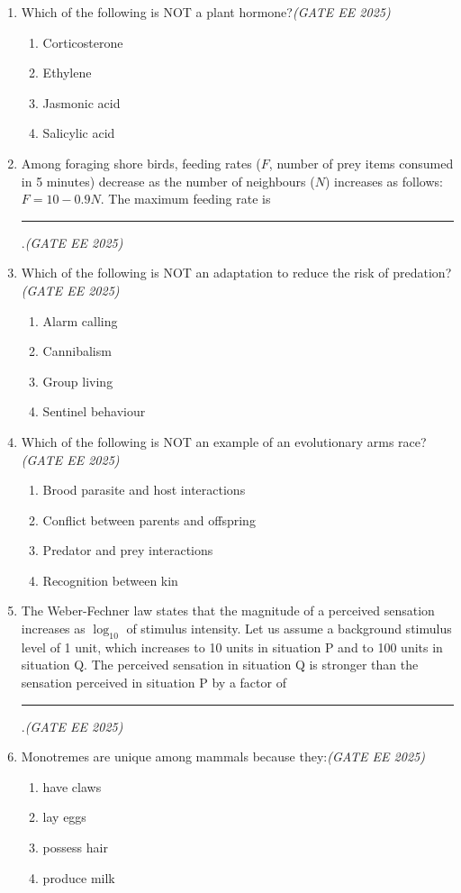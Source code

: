\documentclass[11pt,a4paper]{article}
\begin{document}
\begin{enumerate}[leftmargin=*,label=\textbf{Q.\arabic*},resume]
\item Which of the following is NOT a plant hormone?\hfill \textit{(GATE EE 2025)}
\begin{enumerate}[label=(\Alph*)]
\item Corticosterone
\item Ethylene
\item Jasmonic acid
\item Salicylic acid
\end{enumerate}

\item Among foraging shore birds, feeding rates ($F$, number of prey items consumed in 5 minutes) decrease as the number of neighbours ($N$) increases as follows: $F = 10 - 0.9 N$. The maximum feeding rate is \rule{2cm}{0.15mm}.\hfill \textit{(GATE EE 2025)}

\item Which of the following is NOT an adaptation to reduce the risk of predation?\hfill \textit{(GATE EE 2025)}
\begin{enumerate}[label=(\Alph*)]
\item Alarm calling
\item Cannibalism
\item Group living
\item Sentinel behaviour
\end{enumerate}

\item Which of the following is NOT an example of an evolutionary arms race?\hfill \textit{(GATE EE 2025)}
\begin{enumerate}[label=(\Alph*)]
\item Brood parasite and host interactions
\item Conflict between parents and offspring
\item Predator and prey interactions
\item Recognition between kin
\end{enumerate}

\item The Weber-Fechner law states that the magnitude of a perceived sensation increases as $\log_{10}$ of stimulus intensity. Let us assume a background stimulus level of 1 unit, which increases to 10 units in situation P and to 100 units in situation Q. The perceived sensation in situation Q is stronger than the sensation perceived in situation P by a factor of \rule{2cm}{0.15mm}.\hfill \textit{(GATE EE 2025)}

\item Monotremes are unique among mammals because they:\hfill \textit{(GATE EE 2025)}
\begin{multicols}{2}
\begin{enumerate}[label=(\Alph*)]
\item have claws
\item lay eggs
\item possess hair
\item produce milk
\end{enumerate}
\end{multicols}
\end{enumerate}
\end{document}
